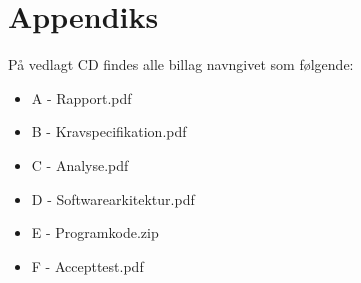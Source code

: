 \documentclass[rapport.tex]{subfiles}
\begin{document}
\section{Appendiks}	
På vedlagt CD findes alle billag navngivet som følgende:
	\begin{itemize}
		\item A - Rapport.pdf
		\item B - Kravspecifikation.pdf
		\item C - Analyse.pdf
		\item D - Softwarearkitektur.pdf
		\item E - Programkode.zip
		\item F - Accepttest.pdf

	\end{itemize}

		
\end{document}
